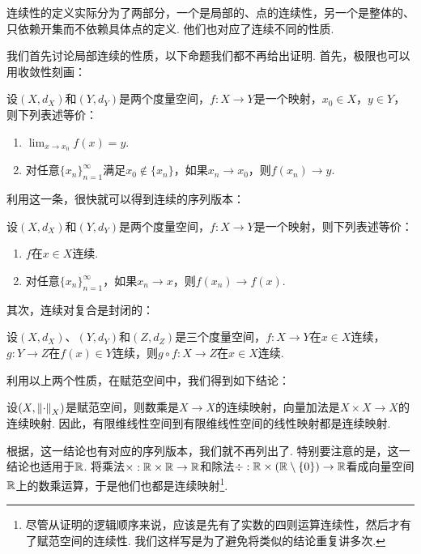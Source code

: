 连续性的定义实际分为了两部分，一个是局部的、点的连续性，另一个是整体的、只依赖开集而不依赖具体点的定义. 他们也对应了连续不同的性质. 

我们首先讨论局部连续的性质，以下命题我们都不再给出证明. 首先，极限也可以用收敛性刻画：

\begin{theorem}\label{theorem:limit-converge}
    设$(X,d_X)$和$(Y,d_Y)$是两个度量空间，$f:X\to Y$是一个映射，$x_0\in X$，$y\in Y$，则下列表述等价：
    \begin{enumerate}
        \item $\lim_{x\to x_0}f(x)=y$. 
        \item 对任意$\{x_n\}_{n=1}^\infty$满足$x_0\notin\{x_n\}$，如果$x_n\to x_0$，则$f(x_n)\to y$.
    \end{enumerate}
\end{theorem}

利用这一条，很快就可以得到连续的序列版本：

\begin{corollary}\label{corollary:continuous-converge}
    设$(X,d_X)$和$(Y,d_Y)$是两个度量空间，$f:X\to Y$是一个映射，则下列表述等价：
    \begin{enumerate}
        \item $f$在$x\in X$连续. 
        \item 对任意$\{x_n\}_{n=1}^\infty$，如果$x_n\to x$，则$f(x_n)\to f(x)$.
    \end{enumerate}
\end{corollary}

其次，连续对复合是封闭的：
\begin{proposition}\label{proposition:continuous-composition}
    设$(X,d_X)$、$(Y,d_Y)$和$(Z,d_Z)$是三个度量空间，$f:X\to Y$在$x\in X$连续，$g:Y\to Z$在$f(x)\in Y$连续，则$g\circ f:X\to Z$在$x\in X$连续. 
\end{proposition}

利用以上两个性质，在赋范空间中，我们得到如下结论：
\begin{corollary}\label{corollary:continuous-linear}
    设$(X,\left\|\cdot\right\|_X)$是赋范空间，则数乘是$X\to X$的连续映射，向量加法是$X\times X\to X$的连续映射. 因此，有限维线性空间到有限维线性空间的线性映射都是连续映射. 
\end{corollary}

根据，这一结论也有对应的序列版本，我们就不再列出了. 特别要注意的是，这一结论也适用于$\mathbb{R}$. 将乘法$\times:\mathbb{R}\times\mathbb{R}\to\mathbb{R}$和除法$\div:\mathbb{R}\times(\mathbb{R}\setminus\{0\})\to\mathbb{R}$看成向量空间$\mathbb{R}$上的数乘运算，于是他们也都是连续映射\footnote{尽管从证明的逻辑顺序来说，应该是先有了实数的四则运算连续性，然后才有了赋范空间的连续性. 我们这样写是为了避免将类似的结论重复讲多次.  }. 

